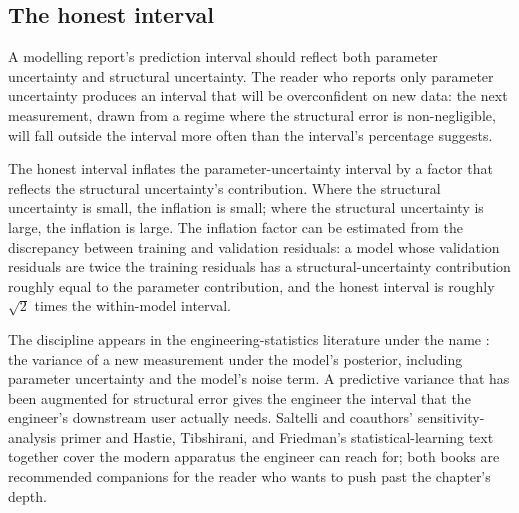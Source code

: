 \subsection{The honest interval}

A modelling report's prediction interval should reflect both
parameter uncertainty and structural uncertainty. The reader
who reports only parameter uncertainty produces an interval that
will be overconfident on new data: the next measurement, drawn
from a regime where the structural error is non-negligible,
will fall outside the interval more often than the interval's
percentage suggests.

The honest interval inflates the parameter-uncertainty interval by
a factor that reflects the structural uncertainty's contribution.
Where the structural uncertainty is small, the inflation is
small; where the structural uncertainty is large, the inflation
is large. The inflation factor can be estimated from the
discrepancy between training and validation residuals: a model
whose validation residuals are twice the training residuals has a
structural-uncertainty contribution roughly equal to the
parameter contribution, and the honest interval is roughly
$\sqrt{2}$ times the within-model interval.

The discipline appears in the engineering-statistics literature
under the name : the variance of a
new measurement under the model's posterior, including parameter
uncertainty and the model's noise term. A predictive variance
that has been augmented for structural error gives the engineer
the interval that the engineer's downstream user actually needs.
Saltelli and coauthors' sensitivity-analysis primer
\cite{text:v2ch18-saltelli-sensitivity-2008} and Hastie, Tibshirani,
and Friedman's statistical-learning text
\cite{text:v2ch18-hastie-statistical-learning-2009} together cover the
modern apparatus the engineer can reach for; both books are
recommended companions for the reader who wants to push past the
chapter's depth.

